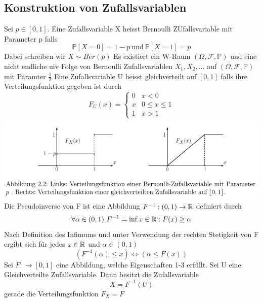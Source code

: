 \subsection{Konstruktion von Zufallsvariablen}
\Def[2.9] \newline
Sei \(p \in [0,1]\). Eine Zufallsvariable X heisst Bernoulli ZUfallsvariable mit Parameter p falls \[\mathbb{P}[X=0] = 1 - p \ \text{und} \ \mathbb{P}[X=1] = p\]
Dabei schreiben wir \( X \sim Ber(p)\)
 \newline
Es existiert ein W-Raum \( (\Omega, \mathcal{F}, \mathbb{P}) \) und eine nicht endliche uiv Folge von Bernoulli Zufallsvariablen \(X_1, X_2, \dots \) auf \( (\Omega, \mathcal{F}, \mathbb{P}) \) mit Paramter \(\frac{1}{2}\)
\Def[2.11] \newline
Eine Zufallsvariable U heisst gleichverteilt auf \([0,1]\) falls ihre Verteilungsfunktion gegeben ist durch\[F_U(x) = \left.
    \begin{cases}
    0 & x < 0 \\
    x & 0 \leq x \leq 1 \\
    1 &  x > 1
\end{cases}
\right.\]
\includegraphics[scale=0.3]{abb2.2.png}
\Def[2.13 Pseudoinverse] \newline
Die Pseudoinverse von F ist eine Abbildung \(F^{-1} : (0,1) \rightarrow \mathbb{R} \) definiert durch \[ \forall \alpha \in (0,1) \ F^{-1} = \inf{x \in \mathbb{R}: F(x) \geq \alpha}\]
Nach Definition des Infimums und unter Verwendung der rechten Stetigkeit von F ergibt sich für jedes \(x \in \mathbb{R} \) und \( \alpha \in (0,1)\)
\[ (F^{-1}(\alpha) \leq x ) \Leftrightarrow (\alpha \leq F(x))\]
\Theo[2.14 Inversionsmethode] \newline
Sei \(F: \rightarrow [0,1]\) eine Abbildung, welche Eigenschaften 1-3 erfüllt. Sei U eine Gleichverteilte Zufallsvariable. Dann besitzt die Zufallsvariable
\[X = F^{-1}(U)\]
gerade die Verteilungsfunktion \(F_X = F\)
